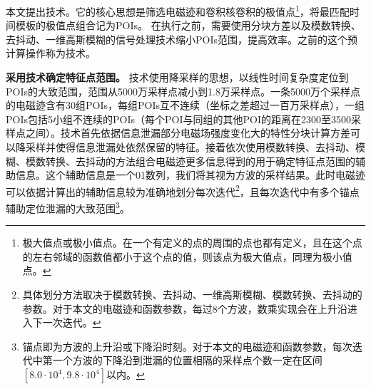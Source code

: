 {{	本文提出\yuchuli 技术。它的核心思想是筛选电磁迹和卷积核卷积的极值点\footnote{极大值点或极小值点。在一个有定义的点的周围的点也都有定义，且在这个点的左右邻域的函数值都小于这个点的值，则该点为极大值点，同理为极小值点。}，将最匹配时间模板的极值点组合记为POIs。
%	
	在执行\yuchuli 之前，需要使用分块方差以及模数转换、去抖动、一维高斯模糊的信号处理技术缩小POIs范围，提高\yuchuli 效率。\yuchuli 之前的这个预计算操作称为\poifanwei 技术。
	
	

	\textbf{采用\poifanwei 技术确定特征点范围。}	
	\poifanwei 技术使用降采样的思想，以线性时间复杂度定位到POIs的大致范围，范围从5000万采样点减小到1.8万采样点。一条5000万个采样点的电磁迹含有30组POIs，每组POIs互不连续（坐标之差超过一百万采样点），一组POIs包括5小组不连续的POIs（每个POI与同组的其他POI的距离在2300至3500采样点之间）。\poifanwei 技术首先依据信息泄漏部分电磁场强度变化大的特性分块计算方差可以降采样并使得信息泄漏处依然保留的特征。接着依次使用模数转换、去抖动、模糊、模数转换、去抖动的方法组合电磁迹更多信息得到的用于确定特征点范围的辅助信息。这个辅助信息是一个01数列，我们将其视为方波的采样结果。此时电磁迹可以依据计算出的辅助信息较为准确地划分每次迭代\footnote{具体划分方法取决于模数转换、去抖动、一维高斯模糊、模数转换、去抖动的参数。对于本文的电磁迹和函数参数，每过8个方波，数乘实现会在上升沿进入下一次迭代。}，且每次迭代中有多个锚点辅助定位泄漏的大致范围\footnote{锚点即为方波的上升沿或下降沿时刻。对于本文的电磁迹和函数参数，每次迭代中第一个方波的下降沿到泄漏的位置相隔的采样点个数一定在区间$[8.0\cdot10^{4},9.8\cdot10^{4}]$以内。}。
	
}}
